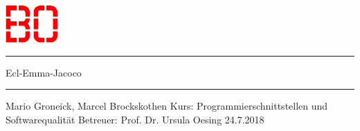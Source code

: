 \begin{titlepage}
\vskip 200pt
\begin{center}
\includegraphics{BO-Logo_o_Wortmarke.png}
\vskip 20pt
\rule{10cm}{0.7pt}
\vskip 20pt
\huge{Ecl-Emma-Jacoco}
\rule{10cm}{0.7pt}
\vskip 20pt
\large{Mario Groneick, Marcel Brockskothen}
\vskip 20pt
\large{Kurs: Programmierschnittstellen und Softwarequalität}
\vskip 20pt
\large{Betreuer: Prof. Dr. Ursula Oesing}
\vskip 100pt
\large{24.7.2018}
\end{center}
\end{titlepage}
